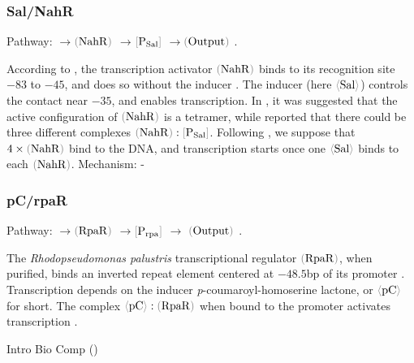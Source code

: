 \documentclass[12pt]{article}
\newcommand{\cbra}[1]{{\color{gray}\ensuremath{#1}}}
\newcommand{\signal}[1]{\ensuremath{\cbra{\langle}\mathrm{#1}\cbra{\rangle}}}
\newcommand{\protein}[1]{\ensuremath{\cbra{(}\mathrm{#1}\cbra{)}}}
\newcommand{\promoter}[1]{\ensuremath{\cbra{[}\mathrm{#1}\cbra{]}}}
\newcommand{\act}{\ensuremath{\to}}
\def\[#1\]{\begin{align}\textstyle#1\end{align}}
\begin{document}
\subsubsection*{Sal/NahR}

Pathway:
%
\[
	\signal{Sal} \act \protein{NahR} \act \promoter{P_{Sal}} \act \protein{Output}
	.
\]

%

According to 
\cite{SchellWender1986, HuangSchell1991},
the transcription activator \protein{NahR}
binds to its recognition site
$-83$ to $-45$,
and does so without the inducer \cite[p.10837]{HuangSchell1991}.
%
The inducer
(here \signal{Sal})
controls the contact near $-35$,
and
enables transcription.
%
%
In \cite{SchellBrownRaju1990},
it was suggested 
that the active configuration of \protein{NahR} is a tetramer,
while \cite{ParkLimShin2005}
reported that 
there could be three different complexes
$\protein{NahR}:\promoter{P_{Sal}}$.
%
%
Following \cite{Peking2013},
we suppose
that 
$4 \times \protein{NahR}$ bind to the DNA,
and
transcription starts
once
one $\signal{Sal}$
binds to each \protein{NahR}.
%
%
Mechanism:
\[
	--
\]


\subsubsection*{pC/rpaR}

Pathway:
%
\[
	\signal{pC} \act \protein{RpaR} \act \promoter{P_{rpa}}
	\act 
	\protein{Output}
	.
\]

The \emph{Rhodopseudomonas palustris} transcriptional regulator
\protein{RpaR},
when purified,
binds an inverted repeat element 
centered at $-48.5$bp
of its promoter
\cite{HirakawaETAL2011}.
%
%
Transcription depends on the inducer 
\emph{p}-coumaroyl-homoserine lactone,
or \signal{pC} for short.
%
%
%
%
The complex 
$\signal{pC} : \protein{RpaR}$
when bound to the promoter
activates transcription
\cite[Discussion]{HirakawaETAL2011}.




\footnotesize



\leavevmode\vfill{\tiny\color{lightgray}\hfill{Intro Bio Comp (\DTMnow)}}
\end{document}
